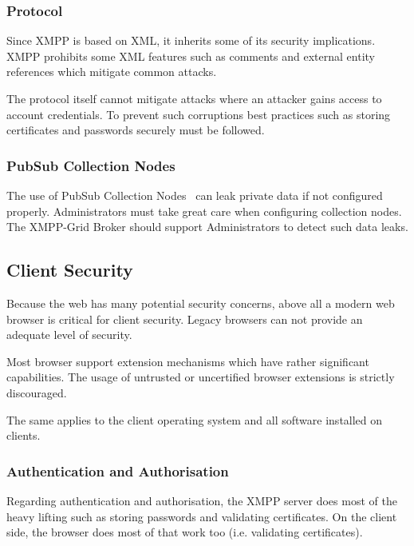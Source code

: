 \subsubsection{Protocol}

Since XMPP is based on XML, it inherits some of its security implications.
XMPP prohibits some XML features such as comments and external entity references which mitigate common attacks.~\cite{rfc6120}

The protocol itself cannot mitigate attacks where an attacker gains access to account credentials.
To prevent such corruptions best practices such as storing certificates and passwords securely must be followed.

\subsubsection{PubSub Collection Nodes}

The use of PubSub Collection Nodes~\cite{xep-0248} can leak private data if not configured properly.
Administrators must take great care when configuring collection nodes.
The XMPP-Grid Broker should support Administrators to detect such data leaks.

\subsection{Client Security}

Because the web has many potential security concerns, above all a modern web browser is critical for client security.
Legacy browsers can not provide an adequate level of security.~\cite{firefox-update-security}

Most browser support extension mechanisms which have rather significant capabilities.
The usage of untrusted or uncertified browser extensions is strictly discouraged.~\cite{browser-extension-security}

The same applies to the client operating system and all software installed on clients.

\subsubsection{Authentication and Authorisation}

Regarding authentication and authorisation, the XMPP server does most of the heavy lifting such as storing passwords and validating certificates.
On the client side, the browser does most of that work too (i.e. validating certificates).

